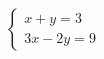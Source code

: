 $\displaystyle
\left\{
\begin{array}{l}
\displaystyle x + y = 3 \\
\displaystyle 3x-2y = 9
\end{array}
\right.
$ %
